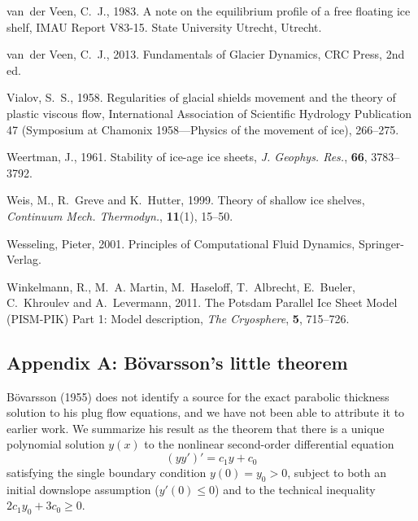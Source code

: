 \documentclass[twocolumn,letterpaper]{igs}
\renewcommand{\dh}{\fontencoding{T1}\selectfont{\symbol{240}}}
\newcommand{\bod}{B\"o\dh varsson\xspace}
\newcommand{\citebod}{B\"o\dh varsson (1955)\nocite{Bodvardsson}\xspace}
\begin{document}
\begin{thebibliography}{29}
van~der Veen, C.~J., 1983. A note on the equilibrium profile of a free floating
  ice shelf, {IMAU} Report V83-15. State University Utrecht, Utrecht.

van~der Veen, C.~J., 2013. Fundamentals of {G}lacier {D}ynamics, CRC Press, 2nd
  ed.

Vialov, S.~S., 1958. Regularities of glacial shields movement and the theory of
  plastic viscous flow, International Association of Scientific Hydrology
  Publication 47 (Symposium at Chamonix 1958---Physics of the movement of ice),
  266--275.

Weertman, J., 1961. Stability of ice-age ice sheets, {\em J. Geophys. Res.\/},
  {\bf 66}, 3783--3792.

Weis, M., R.~Greve and K.~Hutter, 1999. Theory of shallow ice shelves, {\em
  Continuum Mech. Thermodyn.\/}, {\bf 11}(1), 15--50.

Wesseling, Pieter, 2001. Principles of {C}omputational {F}luid {D}ynamics,
  Springer-Verlag.

Winkelmann, R., M.~A. Martin, M.~Haseloff, T.~Albrecht, E.~Bueler, C.~Khroulev
  and A.~Levermann, 2011. The {P}otsdam {P}arallel {I}ce {S}heet {M}odel
  ({PISM-PIK}) {P}art 1: {M}odel description, {\em The Cryosphere\/}, {\bf 5},
  715--726.
\end{thebibliography}

\appendix

\subsection{Appendix A: \bod's little theorem}  \citebod does not identify a source for the exact parabolic thickness solution to his plug flow equations, and we have not been able to attribute it to earlier work.  We summarize his result as the theorem that there is a unique polynomial solution $y(x)$ to the nonlinear second-order differential equation
\begin{equation}
  (y y')' = c_1 y + c_0  \label{eq:abstractode}
\end{equation}
satisfying the single boundary condition $y(0) = y_0 > 0$, subject to both an initial downslope assumption ($y'(0) \le 0$) and to the technical inequality $2 c_1 y_0 + 3 c_0 \ge 0$.
\end{document}
